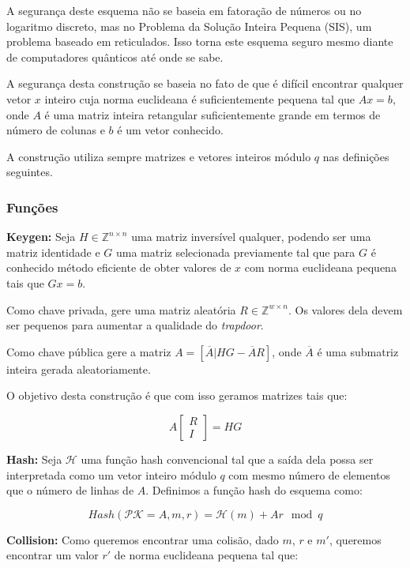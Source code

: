 \documentclass[a4paper]{article}
\begin{document}
    A segurança deste esquema não se baseia em fatoração de números ou no
    logaritmo discreto, mas no Problema da Solução Inteira Pequena (SIS),
    um problema baseado em reticulados. Isso torna este esquema seguro
    mesmo diante de computadores quânticos até onde se sabe.
    
    A segurança desta construção se baseia no fato de que é difícil
    encontrar qualquer vetor $x$ inteiro cuja norma euclideana é
    suficientemente pequena tal que $Ax = b$, onde $A$ é uma matriz
    inteira retangular suficientemente grande em termos de número de
    colunas e $b$ é um vetor conhecido.
    
    A construção utiliza sempre matrizes e vetores inteiros módulo $q$ nas
    definições seguintes.
    
    \subsubsection{Funções}
    
    \textbf{Keygen:} Seja $H \in \mathbb{Z}^{n\times n}$ uma matriz
    inversível qualquer, podendo ser uma matriz identidade e $G$ uma
    matriz selecionada previamente tal que para $G$ é conhecido método
    eficiente de obter valores de $x$ com norma euclideana pequena tais
    que $Gx = b$.
    
    Como chave privada, gere uma matriz aleatória $R \in \mathbb{Z}^{w
      \times n}$. Os valores dela devem ser pequenos para aumentar a
    qualidade do \textit{trapdoor}.
    
    Como chave pública gere a matriz $A=[\overline{A}|HG-\overline{A}R]$,
    onde $\overline{A}$ é uma submatriz inteira gerada aleatoriamente.
    
    O objetivo desta construção é que com isso geramos matrizes tais que:
    
    $$
    A\left[\begin{matrix}R\\I\end{matrix}\right] = HG
    $$
    
    \textbf{Hash: } Seja $\mathcal{H}$ uma função hash convencional tal
    que a saída dela possa ser interpretada como um vetor inteiro módulo
    $q$ com mesmo número de elementos que o número de linhas de
    $A$. Definimos a função hash do esquema como:
    
    $$
    Hash(\mathcal{PK}=A, m, r) = \mathcal{H}(m) + Ar \mod q
    $$
    
    \textbf{Collision: } Como queremos encontrar uma colisão, dado $m$,
    $r$ e $m'$, queremos encontrar um valor $r'$ de norma euclideana
    pequena tal que:
    
\end{document}
